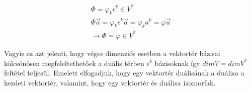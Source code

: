 \documentclass[a4paper, 12pt]{article}
\begin{document}
\begin{align*}
\Phi = \varphi_{k}\epsilon^{k} \in V^{*} \\
\Phi\vec{a} = \varphi_{k}\epsilon^{k}\vec{a} = \varphi_{k}a^{k} = \varphi\vec{a} \\
\rightarrow \Phi = \varphi \in V^{*}
\end{align*}
\par Vagyis ez azt jelenti, hogy véges dimenziós esetben a vektortér bázisai kölcsönösen megfeleltethetőek a duális térben $\epsilon^{k}$ bázisoknak így $dimV = dimV^{*}$ feltétel teljesül. Emelett elfogadjuk, hogy egy vektortér duálisának a duálisa a kezdeti vektortér, valamint, hogy egy vektortér és duálisa izomorfak.
\end{document}
